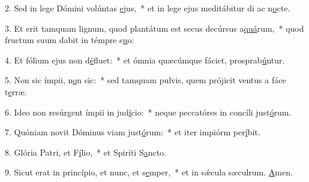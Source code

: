2. Sed in lege Dómini volúntas \uline{e}jus,~* et in lege ejus meditábitur di ac n\uline{o}cte.\par 
3. Et erit tamquam lignum, quod plantátum est secus decúrsus a\uline{quá}rum,~* quod fructum suum dabit in témpre s\uline{u}o:\par 
4. Et fólium ejus non d\uline{é}fluet:~* et ómnia quæcúmque fáciet, prosprab\uline{ú}ntur.\par 
5. Non sic ímpii, n\uline{o}n sic:~* sed tamquam pulvis, quem prójicit ventus a fáce t\uline{e}rræ.\par 
6. Ideo non resúrgent ímpii in jud\uline{í}cio:~* neque peccatóres in concíli just\uline{ó}rum.\par 
7. Quóniam novit Dóminus viam just\uline{ó}rum:~* et iter impiórm per\uline{í}bit.\par 
8. Glória Patri, et F\uline{í}lio,~* et Spiríti S\uline{a}ncto.\par 
9. Sicut erat in princípio, et nunc, et s\uline{e}mper,~* et in sǽcula sæculrum. \uline{A}men.\par 
